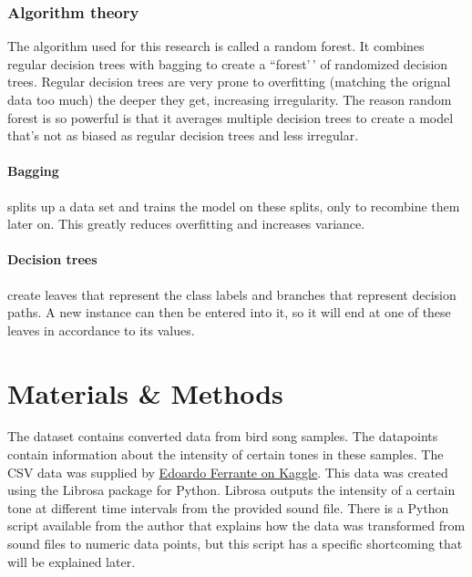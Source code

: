 \documentclass[
]{article}
\begin{document}
\hypertarget{algorithm-theory}{%
\subsubsection{Algorithm theory}\label{algorithm-theory}}

The algorithm used for this research is called a random forest. It
combines regular decision trees with bagging to create a ``forest'\,' of
randomized decision trees. Regular decision trees are very prone to
overfitting (matching the orignal data too much) the deeper they get,
increasing irregularity. The reason random forest is so powerful is that
it averages multiple decision trees to create a model that's not as
biased as regular decision trees and less irregular.

\hypertarget{bagging}{%
\paragraph{Bagging}\label{bagging}}

splits up a data set and trains the model on these splits, only to
recombine them later on. This greatly reduces overfitting and increases
variance.

\hypertarget{decision-trees}{%
\paragraph{Decision trees}\label{decision-trees}}

create leaves that represent the class labels and branches that
represent decision paths. A new instance can then be entered into it, so
it will end at one of these leaves in accordance to its values. \newpage

\hypertarget{materials-methods}{%
\section{Materials \& Methods}\label{materials-methods}}

The dataset contains converted data from bird song samples. The
datapoints contain information about the intensity of certain tones in
these samples. The CSV data was supplied by
\href{https://www.kaggle.com/datasets/fleanend/birds-songs-numeric-dataset}{Edoardo
Ferrante on Kaggle}. This data was created using the Librosa package for
Python. Librosa outputs the intensity of a certain tone at different
time intervals from the provided sound file. There is a Python script
available from the author that explains how the data was transformed
from sound files to numeric data points, but this script has a specific
shortcoming that will be explained later.
\end{document}
